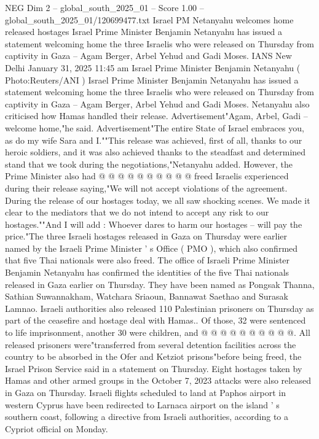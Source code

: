 \begin{textsample}{NEG Dim 2 – global\_south\_2025\_01 – Score 1.00 – global\_south\_2025\_01/120699477.txt}  \label{ex:f2_neg_116}
Israel PM Netanyahu welcomes home released hostages Israel Prime Minister Benjamin Netanyahu has issued a statement welcoming home the three Israelis who were released on Thursday from captivity in Gaza -- Agam Berger, Arbel Yehud and Gadi Moses.
IANS New Delhi January 31, 2025 11:45 am Israel Prime Minister Benjamin Netanyahu ( Photo:Reuters/ANI ) Israel Prime Minister Benjamin Netanyahu has issued a statement welcoming home the three Israelis who were released on Thursday from captivity in Gaza -- Agam Berger, Arbel Yehud and Gadi Moses.
Netanyahu also criticised how Hamas handled their release.
Advertisement"Agam, Arbel, Gadi -- welcome home,"he said.
Advertisement"The entire State of Israel embraces you, as do my wife Sara and I.""This release was achieved, first of all, thanks to our heroic soldiers, and it was also achieved thanks to the steadfast and determined stand that we took during the negotiations,"Netanyahu added.
However, the Prime Minister also had @ @ @ @ @ @ @ @ @ @ freed Israelis experienced during their release saying,"We will not accept violations of the agreement.
During the release of our hostages today, we all saw shocking scenes.
We made it clear to the mediators that we do not intend to accept any risk to our hostages.""And I will add : Whoever dares to harm our hostages -- will pay the price."The three Israeli hostages released in Gaza on Thursday were earlier named by the Israeli Prime Minister ' s Office ( PMO ), which also confirmed that five Thai nationals were also freed.
The office of Israeli Prime Minister Benjamin Netanyahu has confirmed the identities of the five Thai nationals released in Gaza earlier on Thursday.
They have been named as Pongsak Thanna, Sathian Suwannakham, Watchara Sriaoun, Bannawat Saethao and Surasak Lamnao.
Israeli authorities also released 110 Palestinian prisoners on Thursday as part of the ceasefire and hostage deal with Hamas..
Of those, 32 were sentenced to life imprisonment, another 30 were children, and @ @ @ @ @ @ @ @ @ @.
All released prisoners were"transferred from several detention facilities across the country to be absorbed in the Ofer and Ketziot prisons"before being freed, the Israel Prison Service said in a statement on Thursday.
Eight hostages taken by Hamas and other armed groups in the October 7, 2023 attacks were also released in Gaza on Thursday.
Israeli flights scheduled to land at Paphos airport in western Cyprus have been redirected to Larnaca airport on the island ' s southern coast, following a directive from Israeli authorities, according to a Cypriot official on Monday.

\end{textsample}
